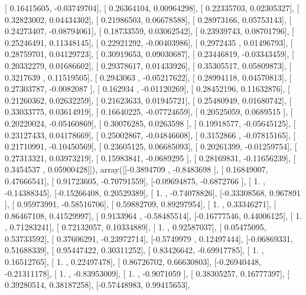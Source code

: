 \documentclass{article}
\begin{document}
       [ 0.16415605, -0.03749704],
       [ 0.26364104,  0.00964298],
       [ 0.22335703,  0.02305327],
       [ 0.32823002,  0.04434302],
       [ 0.21986503,  0.06678588],
       [ 0.28973166,  0.05753143],
       [ 0.24273407, -0.08794061],
       [ 0.18733559,  0.03062542],
       [ 0.23939743,  0.08701796],
       [ 0.25246491,  0.11348145],
       [ 0.22921292, -0.00403986],
       [ 0.2972435 ,  0.01496793],
       [ 0.28759701,  0.04129723],
       [ 0.30919653,  0.09030687],
       [ 0.23446819, -0.03343459],
       [ 0.20332279,  0.01686602],
       [ 0.29378617,  0.01433926],
       [ 0.35305517,  0.05809873],
       [ 0.3217639 ,  0.11519505],
       [ 0.2943063 , -0.05217622],
       [ 0.28994118,  0.04570813],
       [ 0.27303787, -0.0082087 ],
       [ 0.162934  , -0.01120269],
       [ 0.28452196,  0.11632876],
       [ 0.21260362,  0.02632259],
       [ 0.21623633,  0.01945721],
       [ 0.25480949,  0.01680742],
       [ 0.33033775,  0.03614919],
       [ 0.16640225, -0.07724659],
       [ 0.20525059,  0.0689515 ],
       [ 0.20220024, -0.05460869],
       [ 0.30076285,  0.0263598 ],
       [ 0.19918577, -0.05645125],
       [ 0.23127433,  0.04178669],
       [ 0.25002867, -0.04846608],
       [ 0.3152866 , -0.07815165],
       [ 0.21710991, -0.10450569],
       [ 0.23605125,  0.06685093],
       [ 0.20261399, -0.01259754],
       [ 0.27313321,  0.03973219],
       [ 0.15983841, -0.0689295 ],
       [ 0.28169831, -0.11656239],
       [ 0.3454537 ,  0.05900428]]), array([[-0.3894709 , -0.8483698 ],
       [ 0.16849007,  0.47666541],
       [ 0.91723605, -0.70791559],
       [-0.09694875, -0.6872766 ],
       [ 1.        , -0.14388345],
       [-0.15266408,  0.20529389],
       [ 1.        , -0.74078826],
       [-0.33308568,  0.967891  ],
       [ 0.95973991, -0.58516706],
       [ 0.59882709,  0.89297954],
       [ 1.        ,  0.33346271],
       [ 0.86467108,  0.41529997],
       [ 0.9133964 , -0.58485514],
       [-0.16777546,  0.44006125],
       [ 1.        ,  0.71283241],
       [ 0.72132057,  0.10334889],
       [ 1.        ,  0.92587037],
       [ 0.05475095,  0.53733592],
       [ 0.37606291, -0.23972714],
       [-0.5749979 ,  0.12497444],
       [-0.06869331,  0.51688339],
       [ 0.95447422,  0.30311252],
       [ 0.83426642, -0.69917785],
       [ 1.        ,  0.16512765],
       [ 1.        ,  0.22497478],
       [ 0.86726702,  0.66630803],
       [-0.26940448, -0.21311178],
       [ 1.        , -0.83953009],
       [ 1.        , -0.9071059 ],
       [ 0.38305257,  0.16777397],
       [ 0.39280514,  0.38187258],
       [-0.57448983,  0.99415653],
\end{document}
